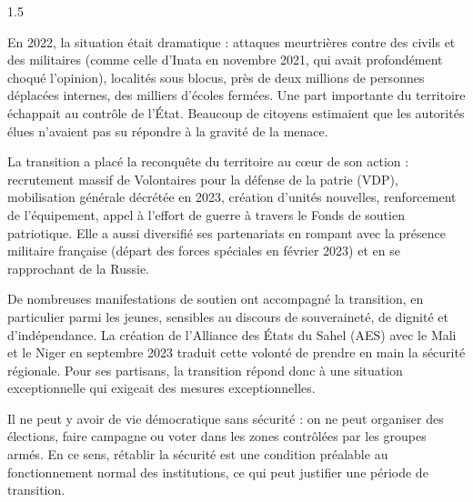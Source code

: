 \documentclass[12pt]{article}
\begin{document}
\begin{spacing}{1.5}


En 2022, la situation était dramatique : attaques meurtrières contre des civils et des militaires (comme celle d'Inata en novembre 2021, qui avait profondément choqué l'opinion), localités sous blocus, près de deux millions de personnes déplacées internes, des milliers d'écoles fermées. Une part importante du territoire échappait au contrôle de l'État. Beaucoup de citoyens estimaient que les autorités élues n'avaient pas su répondre à la gravité de la menace.

La transition a placé la reconquête du territoire au cœur de son action : recrutement massif de Volontaires pour la défense de la patrie (VDP), mobilisation générale décrétée en 2023, création d'unités nouvelles, renforcement de l'équipement, appel à l'effort de guerre à travers le Fonds de soutien patriotique. Elle a aussi diversifié ses partenariats en rompant avec la présence militaire française (départ des forces spéciales en février 2023) et en se rapprochant de la Russie.

De nombreuses manifestations de soutien ont accompagné la transition, en particulier parmi les jeunes, sensibles au discours de souveraineté, de dignité et d'indépendance. La création de l'Alliance des États du Sahel (AES) avec le Mali et le Niger en septembre 2023 traduit cette volonté de prendre en main la sécurité régionale. Pour ses partisans, la transition répond donc à une situation exceptionnelle qui exigeait des mesures exceptionnelles.



Il ne peut y avoir de vie démocratique sans sécurité : on ne peut organiser des élections, faire campagne ou voter dans les zones contrôlées par les groupes armés. En ce sens, rétablir la sécurité est une condition préalable au fonctionnement normal des institutions, ce qui peut justifier une période de transition.


\end{spacing}
\end{document}
